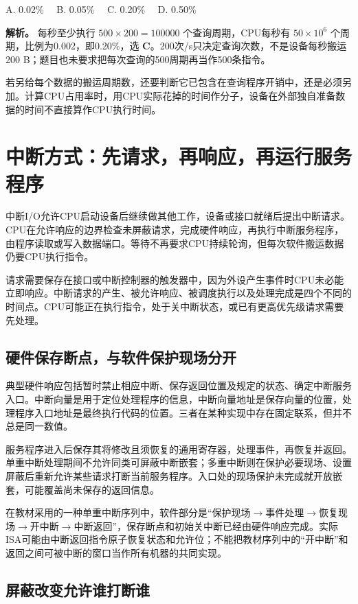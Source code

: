 A. 0.02\%　 B. 0.05\%　 C. 0.20\%　 D. 0.50\%

\textbf{解析。} 每秒至少执行 \(500\times200=100000\) 个查询周期，CPU每秒有 \(50\times10^6\) 个周期，比例为0.002，即0.20\%，选 \textbf{C}。200次/s只决定查询次数，不是设备每秒搬运200 B；题目也未要求把每次查询的500周期再当作500条指令。

若另给每个数据的搬运周期数，还要判断它已包含在查询程序开销中，还是必须另加。计算CPU占用率时，用CPU实际花掉的时间作分子，设备在外部独自准备数据的时间不直接算作CPU执行时间。

\section{中断方式：先请求，再响应，再运行服务程序}\label{CO07-interrupt}

中断I/O允许CPU启动设备后继续做其他工作，设备或接口就绪后提出中断请求。CPU在允许响应的边界检查未屏蔽请求，完成硬件响应，再执行中断服务程序，由程序读取或写入数据端口。等待不再要求CPU持续轮询，但每次软件搬运数据仍要CPU执行指令。

请求需要保存在接口或中断控制器的触发器中，因为外设产生事件时CPU未必能立即响应。中断请求的产生、被允许响应、被调度执行以及处理完成是四个不同的时间点。CPU可能正在执行指令，处于关中断状态，或已有更高优先级请求需要先处理。

\subsection{硬件保存断点，与软件保护现场分开}\label{CO07-entry}

典型硬件响应包括暂时禁止相应中断、保存返回位置及规定的状态、确定中断服务入口。中断向量是用于定位处理程序的信息，中断向量地址是保存向量的位置，处理程序入口地址是最终执行代码的位置。三者在某种实现中存在固定联系，但并不总是同一数值。

服务程序进入后保存其将修改且须恢复的通用寄存器，处理事件，再恢复并返回。单重中断处理期间不允许同类可屏蔽中断嵌套；多重中断则在保护必要现场、设置屏蔽后重新允许某些请求打断当前服务程序。入口处的现场保护未完成就开放嵌套，可能覆盖尚未保存的返回信息。

在教材采用的一种单重中断序列中，软件部分是“保护现场\ensuremath{\to}事件处理\ensuremath{\to}恢复现场\ensuremath{\to}开中断\ensuremath{\to}中断返回”，保存断点和初始关中断已经由硬件响应完成。实际ISA可能由中断返回指令原子恢复状态和允许位；不能把教材序列中的“开中断”和返回之间可被中断的窗口当作所有机器的共同实现。

\subsection{屏蔽改变允许谁打断谁}\label{CO07-mask}

